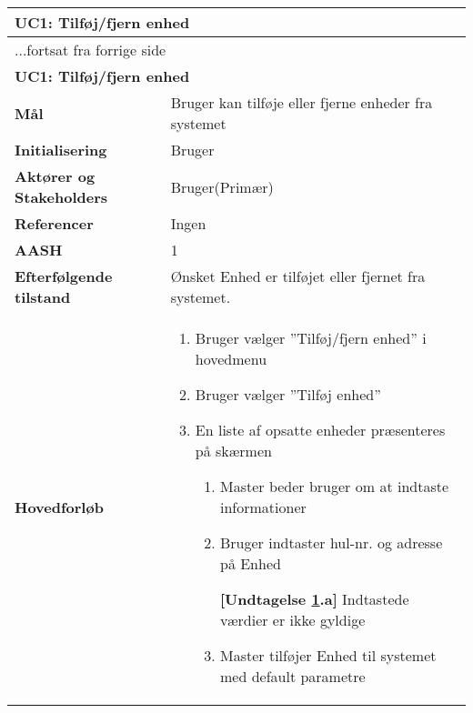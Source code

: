 \begin{center} \centering \label{UC1}
	\begin{longtable}{|p{5cm}|p{9cm}|}  %
	\hline
		\multicolumn{2}{|l|}{\textbf{UC1: Tilføj\slash fjern enhed}} \\\hline %
		\endfirsthead
		
		\multicolumn{2}{l}{...fortsat fra forrige side} \\ \hline %
		\multicolumn{2}{|l|}{\textbf{UC1: Tilføj\slash fjern enhed}} \\\hline %
		\endhead	
		
		\textbf{Mål}								&Bruger kan tilføje eller fjerne enheder fra systemet			\\\hline
		\textbf{Initialisering}					&Bruger														\\\hline
		\textbf{Aktører og Stakeholders}			&Bruger(Primær)												\\\hline 
		\textbf{Referencer}						&Ingen														\\\hline
		\textbf{AASH}							&1															\\\hline
		\textbf{Efterfølgende tilstand}			&Ønsket Enhed er tilføjet eller fjernet fra systemet.		\\\hline
		\textbf{Hovedforløb}					
			&\begin{enumerate}
	
				\item Bruger vælger ''Tilføj/fjern enhed'' i hovedmenu
				
				\item \label{uc1valg} Bruger vælger ''Tilføj enhed''
				
				\item En liste af opsatte enheder præsenteres på skærmen				
				
				\begin{enumerate}
					\item \label{uc1indtast} Master beder bruger om at indtaste informationer
					
					\item \label{uc1indtast_fejl} Bruger indtaster hul-nr. og adresse på Enhed
					
						\textbf{[Undtagelse \ref{uc1indtast_fejl}.a]} \newline
						Indtastede værdier er ikke gyldige
					
					\item Master tilføjer Enhed til systemet med default parametre
					

\end{enumerate}
\end{enumerate}
\end{longtable}
\end{center}
